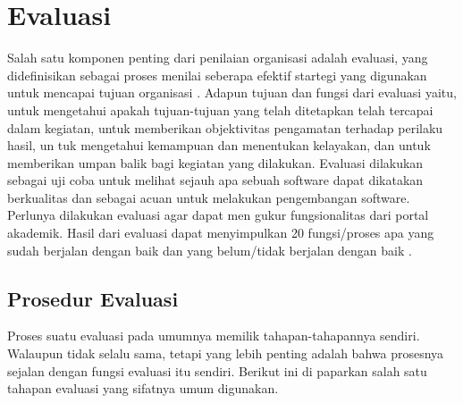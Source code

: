 \section{Evaluasi}
Salah satu komponen penting dari penilaian organisasi adalah evaluasi, yang didefinisikan sebagai proses menilai seberapa efektif startegi yang digunakan untuk mencapai tujuan organisasi \cite{al2018evaluasi}. Adapun tujuan dan fungsi dari evaluasi yaitu, untuk mengetahui apakah tujuan-tujuan yang telah ditetapkan telah tercapai dalam kegiatan, untuk memberikan objektivitas pengamatan terhadap perilaku hasil, un tuk mengetahui kemampuan dan menentukan kelayakan, dan untuk memberikan umpan balik bagi kegiatan yang dilakukan. Evaluasi dilakukan sebagai uji coba untuk melihat sejauh apa sebuah software dapat dikatakan berkualitas dan sebagai acuan untuk melakukan pengembangan software. Perlunya dilakukan evaluasi agar dapat men gukur fungsionalitas dari portal akademik. Hasil dari evaluasi dapat menyimpulkan 20 fungsi/proses apa yang sudah berjalan dengan baik dan yang belum/tidak berjalan dengan baik \cite{terttiaavini2014analisa}.

\subsection{Prosedur Evaluasi}
Proses suatu evaluasi pada umumnya memilik tahapan-tahapannya sendiri. Walaupun tidak selalu sama, tetapi yang lebih penting adalah bahwa prosesnya sejalan dengan fungsi evaluasi itu sendiri. Berikut ini di paparkan salah satu tahapan evaluasi yang sifatnya umum digunakan. 

